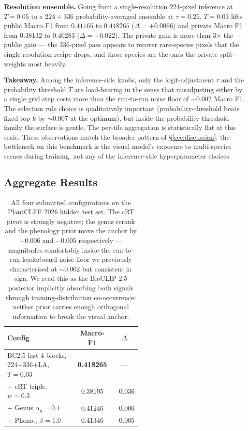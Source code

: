 \documentclass[sigconf]{ceurart}
\begin{document}
\textbf{Resolution ensemble.} Going from a single-resolution 224-pixel inference at $T{=}0.05$ to a $224+336$ probability-averaged ensemble at $\tau{=}0.25$, $T{=}0.03$ lifts public Macro F1 from $0.41165$ to $0.418265$ ($\Delta = +0.0066$) and private Macro F1 from $0.38132$ to $0.40283$ ($\Delta = +0.022$). The private gain is more than 3$\times$ the public gain --- the 336-pixel pass appears to recover rare-species pixels that the single-resolution recipe drops, and those species are the ones the private split weights most heavily.

\textbf{Takeaway.} Among the inference-side knobs, only the logit-adjustment $\tau$ and the probability threshold $T$ are load-bearing in the sense that misadjusting either by a single grid step costs more than the run-to-run noise floor of $\sim$0.002 Macro F1. The selection rule choice is qualitatively important (probability-threshold beats fixed top-$k$ by $\sim$0.007 at the optimum), but inside the probability-threshold family the surface is gentle. The per-tile aggregation is statistically flat at this scale. These observations match the broader pattern of \S\ref{sec:discussion}: the bottleneck on this benchmark is the visual model's exposure to multi-species scenes during training, not any of the inference-side hyperparameter choices.

\subsection{Aggregate Results}
\begin{table}[ht]
\centering
\scriptsize
\setlength{\tabcolsep}{2pt}
\begin{tabular}{@{}p{0.55\linewidth}cc@{}}
\toprule
Config & Macro-F1 & $\Delta$ \\
\midrule
BC2.5 last 4 blocks, 224+336+LA, $T{=}0.03$ & \textbf{0.418265} & --- \\
\hspace{1em}+ cRT triple, $w{=}0.3$ & 0.38195 & $-0.036$ \\
\hspace{1em}+ Genus $\alpha_g{=}0.1$ & 0.41246 & $-0.006$ \\
\hspace{1em}+ Pheno., $\beta{=}1.0$ & 0.41346 & $-0.005$ \\
\bottomrule
\end{tabular}
\caption{All four submitted configurations on the PlantCLEF 2026 hidden test set. The cRT pivot is strongly negative; the genus rerank and the phenology prior move the anchor by $-0.006$ and $-0.005$ respectively --- magnitudes comfortably inside the run-to-run leaderboard noise floor we previously characterised at ${\sim}0.002$ but consistent in sign. We read this as the BioCLIP 2.5 posterior implicitly absorbing both signals through training-distribution co-occurrence: neither prior carries enough orthogonal information to break the visual anchor.}
\label{tab:summary}
\end{table}
\end{document}
